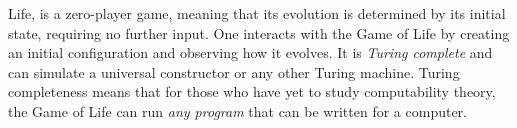 Life, is a zero-player game, meaning that its evolution is determined by its
initial state, requiring no further input. One interacts with the Game of Life
by creating an initial configuration and observing how it evolves. It is
\emph{Turing complete} and can simulate a universal constructor or any other
Turing machine. Turing completeness means that for those who have yet to study
computability theory, the Game of Life can run \emph{any program} that can be
written for a computer.

